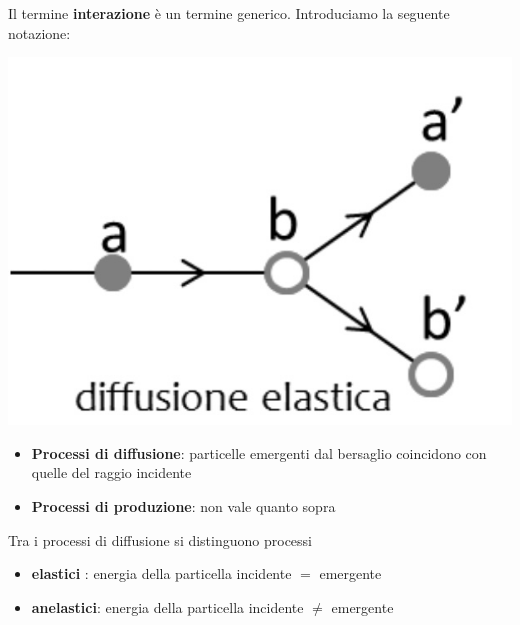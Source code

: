 Il termine \textbf{interazione} è un termine generico.
Introduciamo la seguente notazione:

\begin{marginfigure}
	\includegraphics{figs/diffusione-elastica}
	\label{fig:diffusione-elastica}
\end{marginfigure}

\begin{itemize}
	\tightlist
	\item
	\textbf{Processi di diffusione}: particelle emergenti dal bersaglio
	coincidono con quelle del raggio incidente
	\item
	\textbf{Processi di produzione}: non vale quanto sopra
\end{itemize}
Tra i processi di diffusione si distinguono processi

\begin{itemize}
	\tightlist
	\item
	\textbf{elastici} : energia della particella incidente \(=\) emergente
	\item
	\textbf{anelastici}: energia della particella incidente \(\neq\)
	emergente
\end{itemize}


